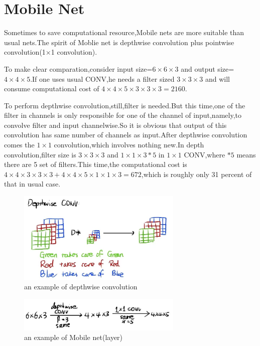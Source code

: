 \documentclass{article}
\begin{document}
\section{Mobile Net}
Sometimes to save computational resource,Mobile nets are more suitable than usual nets.The spirit of Moblie net is depthwise convolution plus pointwise convolution(1$\times$1 convolution).
\par To make clear comparation,consider input size=$6\times6\times3$ and output size=$4\times4\times5$.If one uses usual CONV,he needs a filter sized $3\times3\times3$ and will consume computational cost of $4\times4\times5\times3\times3\times3=2160$.
\par To perform depthwise convolution,still,filter is needed.But this time,one of the filter in channels is only responsible for one of the channel of input,namely,to convolve filter and input channelwise.So it is obvious that output of this convolution has same number of channels as input.After depthwise convolution comes the $1\times1$ convolution,which involves nothing new.In depth convolution,filter size is $3\times3\times3$ and $1\times1\times3*5$ in $1\times1$ CONV,where $*5$ means there are 5 set of filters.This time,the computational cost is $4\times4\times3\times3\times3+4\times4\times5\times1\times1\times3=672$,which is roughly only 31 percent of that in usual case.
\begin{figure}[htbp]
	\centering
	\includegraphics[width=0.7\textwidth]{14.jpg}
	\caption{an example of depthwise convolution}
\end{figure}
\begin{figure}[htbp]
	\centering
	\includegraphics[width=0.7\textwidth]{15.jpg}
	\caption{an example of Mobile net(layer)}
\end{figure}
\end{document}
